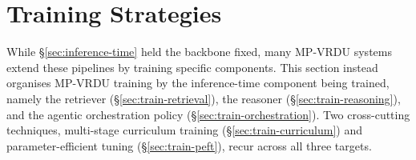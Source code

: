 \documentclass[11pt]{article}
\begin{document}

\section{Training Strategies}
\label{sec:training}
While §\ref{sec:inference-time} held the backbone fixed, many MP-VRDU systems extend these pipelines by training specific components. This section instead organises MP-VRDU training by the inference-time component being trained, namely the retriever (§\ref{sec:train-retrieval}), the reasoner (§\ref{sec:train-reasoning}), and the agentic orchestration policy (§\ref{sec:train-orchestration}). Two cross-cutting techniques, multi-stage curriculum training (§\ref{sec:train-curriculum}) and parameter-efficient tuning (§\ref{sec:train-peft}), recur across all three targets.

\end{document}
